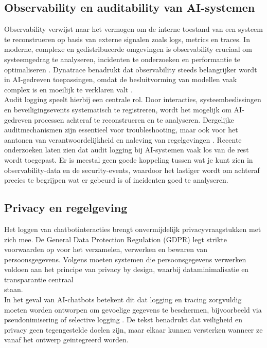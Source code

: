 \subsection{Observability en auditability van AI-systemen}

\noindent Observability verwijst naar het vermogen om de interne toestand van een systeem te reconstrueren op basis van externe signalen zoals logs, metrics en traces. In moderne, complexe en gedistribueerde omgevingen is observability cruciaal om systeemgedrag te analyseren, incidenten te onderzoeken en performantie te optimaliseren \autocite{Li2021}. Dynatrace benadrukt dat observability steeds belangrijker wordt in AI-gedreven toepassingen, omdat de besluitvorming van modellen vaak complex is en moeilijk te verklaren valt \autocite{DynatraceAIObs2025}.\\


\noindent Audit logging speelt hierbij een centrale rol. Door interacties, systeembeslissingen en beveiligingsevents systematisch te registreren, wordt het mogelijk om AI-gedreven processen achteraf te reconstrueren en te analyseren. Dergelijke auditmechanismen zijn essentieel voor troubleshooting, maar ook voor het aantonen van verantwoordelijkheid en naleving van regelgevingen \autocite{Novelli2023}. Recente onderzoeken laten zien dat audit logging bij AI-systemen vaak los van de rest wordt toegepast. Er is meestal geen goede koppeling tussen wat je kunt zien in observability-data en de security-events, waardoor het lastiger wordt om achteraf precies te begrijpen wat er gebeurd is of incidenten goed te analyseren.

\subsection{Privacy en regelgeving}

\noindent Het loggen van chatbotinteracties brengt onvermijdelijk privacyvraagstukken met zich mee. De General Data Protection Regulation (GDPR) legt strikte voorwaarden op voor het verzamelen, verwerken en bewaren van persoonsgegevens. Volgens \textcite{Voigt2017} moeten systemen die persoonsgegevens verwerken voldoen aan het principe van privacy by design, waarbij dataminimalisatie en transparantie centraal \\staan.\\

\noindent In het geval van AI-chatbots betekent dit dat logging en tracing zorgvuldig moeten worden ontworpen om gevoelige gegevens te beschermen, bijvoorbeeld via pseudonimisering of selective logging \autocite{EDPBGuidelines4_2019}. De tekst benadrukt dat veiligheid en privacy geen tegengestelde doelen zijn, maar elkaar kunnen versterken wanneer ze vanaf het ontwerp geïntegreerd worden.


